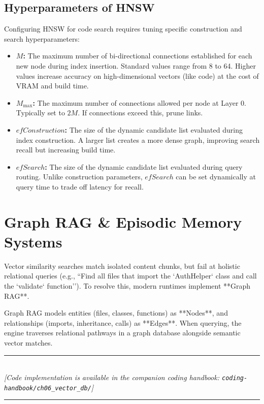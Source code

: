 \subsection{Hyperparameters of HNSW}
Configuring HNSW for code search requires tuning specific construction and search hyperparameters:
\begin{itemize}
    \item \textbf{$M$:} The maximum number of bi-directional connections established for each new node during index insertion. Standard values range from 8 to 64. Higher values increase accuracy on high-dimensional vectors (like code) at the cost of VRAM and build time.
    \item \textbf{$M_{\text{max}}$:} The maximum number of connections allowed per node at Layer 0. Typically set to $2M$. If connections exceed this, prune links.
    \item \textbf{$efConstruction$:} The size of the dynamic candidate list evaluated during index construction. A larger list creates a more dense graph, improving search recall but increasing build time.
    \item \textbf{$efSearch$:} The size of the dynamic candidate list evaluated during query routing. Unlike construction parameters, $efSearch$ can be set dynamically at query time to trade off latency for recall.
\end{itemize}

\section{Graph RAG \& Episodic Memory Systems}

Vector similarity searches match isolated content chunks, but fail at holistic relational queries (e.g., ``Find all files that import the `AuthHelper` class and call the `validate` function''). To resolve this, modern runtimes implement **Graph RAG**.

Graph RAG models entities (files, classes, functions) as **Nodes**, and relationships (imports, inheritance, calls) as **Edges**. When querying, the engine traverses relational pathways in a graph database alongside semantic vector matches.


\begin{center}
\noindent\rule{0.6\textwidth}{0.4pt} \\
\vspace{0.3em}
\textit{[Code implementation is available in the companion coding handbook: \texttt{coding-handbook/ch06\_vector\_db/}]} \\
\noindent\rule{0.6\textwidth}{0.4pt}
\end{center}


